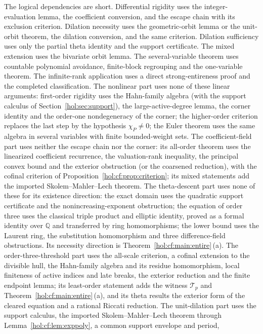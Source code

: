 \documentclass[11pt]{article}
\numberwithin{equation}{section}
\theoremstyle{definition}
\theoremstyle{remark}
\newcommand{\Q}{\mathbb Q}
\begin{document}
The logical dependencies are short. Differential rigidity uses the
integer-evaluation lemma, the coefficient conversion, and the escape chain
with its exclusion criterion. Dilation necessity uses the geometric-orbit
lemma or the unit-orbit theorem, the dilation conversion, and the same
criterion. Dilation sufficiency uses only the partial theta identity and the
support certificate. The mixed extension uses the bivariate orbit lemma. The
several-variable theorem uses countable polynomial avoidance, finite-block
regrouping and the one-variable theorem. The infinite-rank application uses a
direct strong-entireness proof and the completed classification. The
nonlinear part uses none of these linear arguments: first-order rigidity uses
the Hahn-family algebra (with the support calculus of
Section~\ref{hol:sec:support}), the large-active-degree lemma, the corner
identity and the order-one nondegeneracy of the corner; the higher-order
criterion replaces the last step by the hypothesis $\chi_P\ne0$; the Euler
theorem uses the same algebra in several variables with finite bounded-weight
sets. The coefficient-field part uses neither the escape chain nor the corner:
its all-order theorem uses the linearized coefficient recurrence, the
valuation-rank inequality, the principal convex bound and the exterior
obstruction (or the coarsened reduction), with the cofinal criterion of
Proposition~\ref{hol:cf:prop:criterion}; its mixed statements add the imported
Skolem--Mahler--Lech theorem. The theta-descent part uses none of these for
its existence direction: the exact domain uses the quadratic support
certificate and the nonincreasing-exponent obstruction; the equation of order
three uses the classical triple product and elliptic identity, proved as a
formal identity over $\Q$ and transferred by ring homomorphisms; the lower
bound uses the Laurent ring, the substitution homomorphism and three
difference-field obstructions. Its necessity direction is
Theorem~\ref{hol:cf:main:entire}\,(a). The order-three-threshold part uses
the all-scale criterion, a cofinal extension to the divisible hull, the
Hahn-family algebra and its residue homomorphism, local finiteness of active
indices and late breaks, the exterior reduction and the finite endpoint lemma;
its least-order statement adds the witness $\mathcal T_p$ and
Theorem~\ref{hol:cf:main:entire}\,(a), and its theta results the exterior form
of the cleared equation and a rational Riccati reduction. The unit-dilation
part uses the support calculus, the imported Skolem--Mahler--Lech theorem
through Lemma~\ref{hol:cf:lem:exppoly}, a common support envelope and period,
\end{document}
